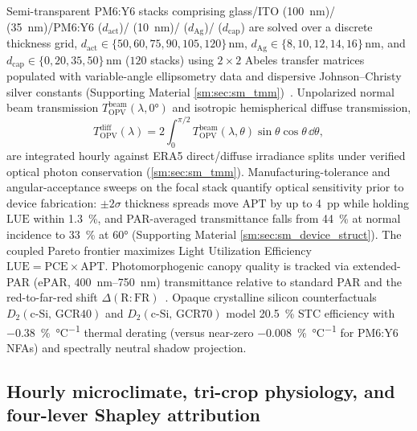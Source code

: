 \documentclass[preprint,12pt,a4paper]{elsarticle}
\begin{document}
Semi-transparent PM6:Y6 stacks comprising glass/\allowbreak ITO (\qty{100}{\nano\meter})/\allowbreak {} (\qty{35}{\nano\meter})/\allowbreak PM6:Y6 ($d_{\mathrm{act}}$)/\allowbreak {} (\qty{10}{\nano\meter})/\allowbreak {} ($d_{\mathrm{Ag}}$)/\allowbreak {} ($d_{\mathrm{cap}}$) are solved over a discrete thickness grid, $d_{\mathrm{act}}\in\{50,60,75,90,105,120\}\,\unit{\nano\meter}$, $d_{\mathrm{Ag}}\in\{8,10,12,14,16\}\,\unit{\nano\meter}$, and $d_{\mathrm{cap}}\in\{0,20,35,50\}\,\unit{\nano\meter}$ ($\num{120}$ stacks) using $2\times 2$ Abeles transfer matrices populated with variable-angle ellipsometry data and dispersive Johnson--Christy silver constants (Supporting Material \cref{sm:sec:sm_tmm})~\cite{Lunt2011,Ravishankar2020,Shen2025NatCommun}. Unpolarized normal beam transmission $T_{\mathrm{OPV}}^{\mathrm{beam}}(\lambda,\ang{0})$ and isotropic hemispherical diffuse transmission,
\begin{equation}
 T_{\mathrm{OPV}}^{\mathrm{diff}}(\lambda) = 2\int_0^{\pi/2} T_{\mathrm{OPV}}^{\mathrm{beam}}(\lambda,\theta)\sin\theta\cos\theta\,\dd\theta,
 \label{eq:tmm_diff_main}
\end{equation}
are integrated hourly against ERA5 direct/diffuse irradiance splits under verified optical photon conservation (\cref{sm:sec:sm_tmm}). Manufacturing-tolerance and angular-acceptance sweeps on the focal stack quantify optical sensitivity prior to device fabrication: $\pm2\sigma$ thickness spreads move $\mathrm{APT}$ by up to \qty{4}{pp} while holding $\mathrm{LUE}$ within \qty{1.3}{\percent}, and PAR-averaged transmittance falls from \qty{44}{\percent} at normal incidence to \qty{33}{\percent} at \ang{60} (Supporting Material \cref{sm:sec:sm_device_struct}). The coupled Pareto frontier maximizes Light Utilization Efficiency $\mathrm{LUE} = \mathrm{PCE}\times \mathrm{APT}$. Photomorphogenic canopy quality is tracked via extended-PAR ($\mathrm{ePAR}$, \qtyrange{400}{750}{\nano\meter}) transmittance relative to standard PAR and the red-to-far-red shift $\Delta(\mathrm{R{:}FR})$~\cite{Thompson2020,Jiang2025IJMS}. Opaque crystalline silicon counterfactuals $D_2(\mathrm{c\text{-}Si,\,GCR40})$ and $D_2(\mathrm{c\text{-}Si,\,GCR70})$ model \qty{20.5}{\percent} STC efficiency with \qty{-0.38}{\percent\per\celsius} thermal derating (versus near-zero \qty{-0.008}{\percent\per\celsius} for PM6:Y6 NFAs) and spectrally neutral shadow projection.

\subsection{Hourly microclimate, tri-crop physiology, and four-lever Shapley attribution}
\label{sec:methods_agro}
\end{document}
